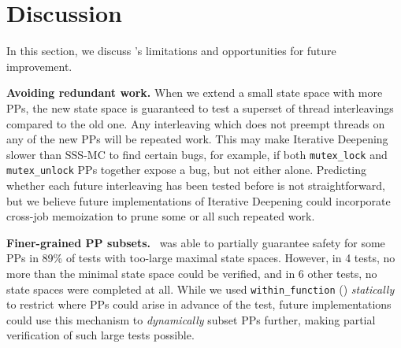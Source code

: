 \section{Discussion}
\label{sec:future}

In this section, we discuss \quicksand's limitations and opportunities for future improvement.

{\bf Avoiding redundant work.}
When we extend a small state space with more PPs, the new state space is guaranteed to test a superset of thread interleavings compared to the old one.
Any interleaving which does not preempt threads on any of the new PPs will be repeated work.
%
This may make Iterative Deepening slower than SSS-MC to find certain bugs,
for example, if both {\tt mutex\_lock} and {\tt mutex\_unlock} PPs together expose a bug, but not either alone.
Predicting whether each future interleaving has been tested before is not straightforward,
but we believe future implementations of Iterative Deepening could incorporate cross-job memoization
to prune some or all such repeated work.

{\bf Finer-grained PP subsets.}
\quicksand~was able to partially guarantee safety for some PPs in 89\% of tests with too-large maximal state spaces.
However, in 4 tests, no more than the minimal state space could be verified,
and in 6 other tests, no state spaces were completed at all.
While we used {\tt within\_function} (\sect{\ref{sec:landslide}}) {\em statically} to restrict where PPs could arise in advance of the test,
future
implementations could use this mechanism to {\em dynamically} subset PPs further,
making partial verification of such large tests possible.

